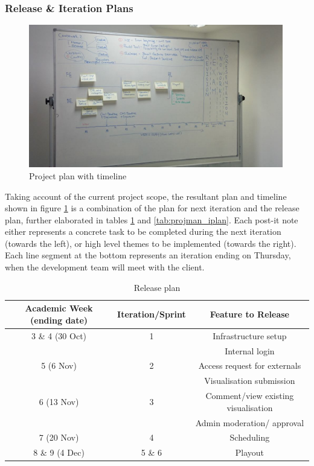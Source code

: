 \documentclass[a4paper, titlepage]{article}
\begin{document}
\subsubsection{Release \& Iteration Plans}

\begin{figure}[h]
  \centering
    \includegraphics[width = 0.99\textwidth]{./projman/timeline.jpg}
  \caption{Project plan with timeline}
  \label{fig:projman_timeline}
\end{figure}


Taking account of the current project scope, the resultant plan and timeline shown in figure 
\ref{fig:projman_timeline} is a
combination of the plan for next iteration and the release plan, further elaborated in tables 
\ref{tab:projman_rplan} and \ref{tab:projman_iplan}. Each post-it note either represents a 
concrete task to be completed during the next iteration (towards the left), or
high level themes to be implemented (towards the right). Each line segment at
the bottom represents an iteration ending on Thursday, when the development
team will meet with the client.

\begin{table}[h]
  \begin{center}
  \begin{tabular}{c | c | c}
     \textbf{Academic Week (ending date)} & \textbf{Iteration/Sprint} & \textbf{Feature to Release} \\ \hline
     3 \& 4 (30 Oct) & 1 & Infrastructure setup \\
      & & Internal login \\
     5 (6 Nov) & 2 & Access request for externals \\
      & & Visualisation submission \\
     6 (13 Nov) & 3 & Comment/view existing visualisation \\
      & & Admin moderation/ approval \\
     7 (20 Nov) & 4 & Scheduling \\
     8 \& 9 (4 Dec) & 5 \& 6 & Playout \\
  \end{tabular}
  \end{center}
  \caption{Release plan}
  \label{tab:projman_rplan}
\end{table}
\end{document}
